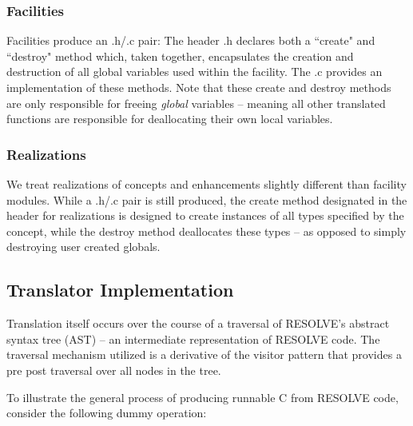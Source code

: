 \subsubsection{Facilities}
\label{sec:facilitiesoverview}
Facilities produce an .h/.c pair: The header .h declares both a ``create" and ``destroy" method which, taken together, encapsulates the creation and destruction of all global variables used within the facility. The .c provides an implementation of these methods.  Note that these create and destroy methods are only responsible for freeing \textit{global} variables -- meaning all other translated functions are responsible for deallocating their own local variables. 

\subsubsection{Realizations}
\label{sec:facilitiesrealizations}
We treat realizations of concepts and enhancements slightly different than facility modules. While a .h/.c pair is still produced, the create method designated in the header for realizations is designed to create instances of all types specified by the concept, while the destroy method deallocates these types -- as opposed to simply destroying user created globals.

\subsection{Translator Implementation}

Translation itself occurs over the course of a traversal of RESOLVE's abstract syntax tree (AST) -- an intermediate representation of RESOLVE code. The traversal mechanism utilized is a derivative of the visitor pattern that provides a pre post traversal over all nodes in the tree. 


To illustrate the general process of producing runnable C from RESOLVE code, consider the following dummy operation:

